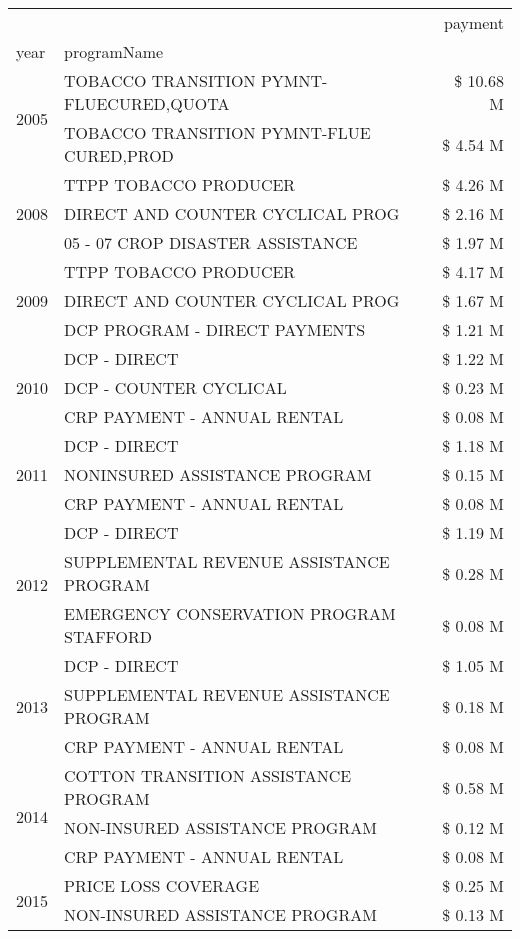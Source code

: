\begin{tabular}{llr}
\toprule
 &  & payment \\
year & programName &  \\
\midrule
\multirow[t]{2}{*}{2005} & TOBACCO TRANSITION PYMNT-FLUECURED,QUOTA & \$ 10.68 M \\
 & TOBACCO TRANSITION PYMNT-FLUE CURED,PROD & \$ 4.54 M \\
\cline{1-3}
\multirow[t]{3}{*}{2008} & TTPP TOBACCO PRODUCER & \$ 4.26 M \\
 & DIRECT AND COUNTER CYCLICAL PROG & \$ 2.16 M \\
 & 05 - 07 CROP DISASTER ASSISTANCE & \$ 1.97 M \\
\cline{1-3}
\multirow[t]{3}{*}{2009} & TTPP TOBACCO PRODUCER & \$ 4.17 M \\
 & DIRECT AND COUNTER CYCLICAL PROG & \$ 1.67 M \\
 & DCP PROGRAM - DIRECT PAYMENTS & \$ 1.21 M \\
\cline{1-3}
\multirow[t]{3}{*}{2010} & DCP - DIRECT & \$ 1.22 M \\
 & DCP - COUNTER CYCLICAL & \$ 0.23 M \\
 & CRP PAYMENT - ANNUAL RENTAL & \$ 0.08 M \\
\cline{1-3}
\multirow[t]{3}{*}{2011} & DCP - DIRECT & \$ 1.18 M \\
 & NONINSURED ASSISTANCE PROGRAM & \$ 0.15 M \\
 & CRP PAYMENT - ANNUAL RENTAL & \$ 0.08 M \\
\cline{1-3}
\multirow[t]{3}{*}{2012} & DCP - DIRECT & \$ 1.19 M \\
 & SUPPLEMENTAL REVENUE ASSISTANCE PROGRAM & \$ 0.28 M \\
 & EMERGENCY CONSERVATION PROGRAM STAFFORD & \$ 0.08 M \\
\cline{1-3}
\multirow[t]{3}{*}{2013} & DCP - DIRECT & \$ 1.05 M \\
 & SUPPLEMENTAL REVENUE ASSISTANCE PROGRAM & \$ 0.18 M \\
 & CRP PAYMENT - ANNUAL RENTAL & \$ 0.08 M \\
\cline{1-3}
\multirow[t]{3}{*}{2014} & COTTON TRANSITION ASSISTANCE PROGRAM & \$ 0.58 M \\
 & NON-INSURED ASSISTANCE PROGRAM & \$ 0.12 M \\
 & CRP PAYMENT - ANNUAL RENTAL & \$ 0.08 M \\
\cline{1-3}
\multirow[t]{3}{*}{2015} & PRICE LOSS COVERAGE & \$ 0.25 M \\
 & NON-INSURED ASSISTANCE PROGRAM & \$ 0.13 M \\

\end{tabular}
